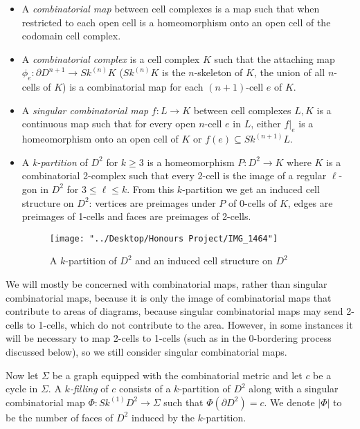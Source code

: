 \documentclass[12pt]{article}
\newcommand{\vs}{\vskip10pt}
\begin{document}
	\begin{itemize}
		\item A \textit{combinatorial map} between cell complexes is a map such that when restricted to each open cell is a homeomorphism onto an open cell of the codomain cell complex. 
		\item A \textit{combinatorial complex} is a cell complex $K$ such that the attaching map $\phi_e: \partial D^{n+1} \rightarrow Sk^{(n)}K$ ($Sk^{(n)}K$ is the $n$-skeleton of $K$, the union of all $n$-cells of $K$) is a combinatorial map for each $(n+1)$-cell $e$ of $K$. 
		\item A \textit{singular combinatorial map} $f: L \rightarrow K$ between cell complexes $L,K$ is a continuous map such that for every open $n$-cell $e$ in $L$, either $f \vert_e$ is a homeomorphism onto an open cell of $K$ or $f(e) \subseteq Sk^{(n+1)} L$. 
		\item A \textit{k-partition} of $D^2$ for $k \geq 3$ is a homeomorphism $P: D^2 \rightarrow K$ where $K$ is a combinatorial 2-complex such that every 2-cell is the image of a regular $\ell$-gon in $D^2$ for $3 \leq \ell \leq k$. From this $k$-partition we get an induced cell structure on $D^2$: vertices are preimages under $P$ of 0-cells of $K$, edges are preimages of 1-cells and faces are preimages of 2-cells. 
		
		
\begin{figure} [H]
	\centering
	\texttt{[image: "../Desktop/Honours Project/IMG\_1464"]}
	\caption{A $k$-partition of $D^2$ and an induced cell structure on $D^2$}
	\label{fig:img1464}
\end{figure}
		
	\end{itemize} 

	We will mostly be concerned with combinatorial maps, rather than singular combinatorial maps, because it is only the image of combinatorial maps that contribute to areas of diagrams, because singular combinatorial maps may send 2-cells to 1-cells, which do not contribute to the area. However, in some instances it will be necessary to map 2-cells to 1-cells (such as in the 0-bordering process discussed below), so we still consider singular combinatorial maps. 
	
	\vs

	Now let $\Sigma$ be a graph equipped with the combinatorial metric and let $c$ be a cycle in $\Sigma$. A $k$\textit{-filling} of $c$ consists of a $k$-partition of $D^2$ along with a singular combinatorial map $\Phi: Sk^{(1)} D^2 \rightarrow \Sigma$ such that $\Phi(\partial D^2) = c$. We denote $\vert \Phi \vert$ to be the number of faces of $D^2$ induced by the $k$-partition. 
	
\end{document}
